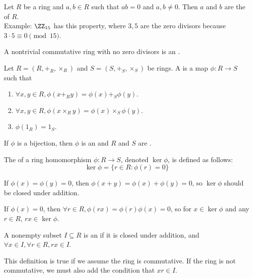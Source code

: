\documentclass{article}
\begin{document}
\begin{defn}
  Let $R$ be a ring and $a, b \in R$ such that $ab = 0$ and $a, b \neq 0$. Then $a$ and
  $b$ are the  of $R$. \\
  Example: $\ZZ_{15}$ has this property, where $3, 5$ are the zero divisors because
  $3 \cdot 5 \equiv 0 \pmod{15}$. 
\end{defn}

\begin{defn}
  A nontrivial commutative ring with no zero divisors is an .
\end{defn}

\begin{defn}
  Let $R = (R, +_R, \times_R)$ and $S = (S, +_S, \times_S)$ be rings. A
   is a map $\phi : R \rightarrow S$ such that
  \begin{enumerate}
  \item $\forall x, y \in R, \phi(x +_R y) = \phi(x) +_S \phi(y)$.
  \item $\forall x, y \in R, \phi(x \times_R y) = \phi(x) \times_S \phi(y)$.
  \item $\phi(1_R) = 1_S$. 
  \end{enumerate}
  If $\phi$ is a bijection, then $\phi$ is an  and
  $R$ and $S$ are .
\end{defn}

\begin{defn}
  The  of a ring homomorphism $\phi : R \rightarrow S$, denoted
  $\ker \phi$, is defined as follows:
  $$\ker \phi = \{r \in R : \phi(r) = 0\}$$
\end{defn}

\begin{fact}
  If $\phi(x) = \phi(y) = 0$, then $\phi(x + y) = \phi(x) + \phi(y) = 0$, so
  $\ker \phi$ should be closed under addition. 
\end{fact}

\begin{fact}
  If $\phi(x) = 0$, then $\forall r \in R, \phi(rx) = \phi(r)\phi(x) = 0$, so for
  $x \in \ker \phi$ and any $r \in R$, $rx \in \ker \phi$. 
\end{fact}

\begin{defn}
  A nonempty subset $I \subseteq R$ is an  if it is closed under addition,
  and $\forall x \in I, \forall r \in R, rx \in I$.
\end{defn}
\begin{remark}
  This definition is true if we assume the ring is commutative. If the ring is not
  commutative, we must also add the condition that $xr \in I$. 
\end{remark}
\end{document}
